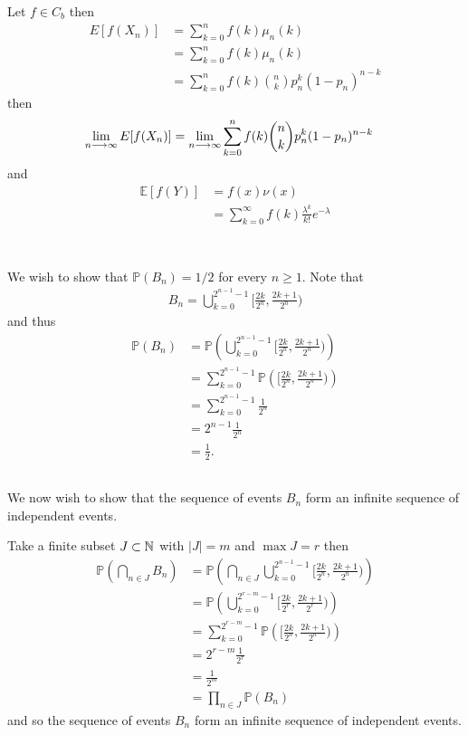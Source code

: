 \documentclass{unswmaths}
\begin{document}
Let $ f \in C_b $ then 
\begin{align}
	E[f(X_n)] &= \sum_{k=0}^n f(k) \mu_n(k) \\
		&= \sum_{k=0}^n f(k) \mu_n(k) \\
		&= \sum_{k=0}^n f(k) {n\choose k} p_n^k(1-p_n)^{n-k}
\end{align}
then
\begin{align}
	\lim_{n\longrightarrow\infty} E[f(X_n)] &= \lim_{n \longrightarrow \infty}\sum_{k=0}^n f(k) {n\choose k} p_n^k(1-p_n)^{n-k}
\end{align}
and
\begin{align}
	\mathbb{E}[f(Y)] &= f(x) \nu(x) \\
		&= \sum_{k=0}^\infty f(k) \frac{\lambda^k}{k!} e^{-\lambda} \\
\end{align}

\section{}
\subsection{}
We wish to show that $ \mathbb{P}(B_n) = 1/2 $ for every $ n \geq 1 $.
Note that 
\begin{align}
	B_n = \bigcup_{k=0}^{2^{n-1} - 1} \Big[ \frac{2k}{2^n}, \frac{2k+1}{2^n} \Big)
\end{align}
and thus
\begin{align}
	\mathbb{P}(B_n) &= \mathbb{P}\left( \bigcup_{k=0}^{2^{n-1} - 1} \Big[ \frac{2k}{2^n}, \frac{2k+1}{2^n} \Big) \right) \\
		&= \sum_{k=0}^{2^{n-1}-1} \mathbb{P}\left( \Big[ \frac{2k}{2^n}, \frac{2k+1}{2^n} \Big) \right) \\
		&= \sum_{k=0}^{2^{n-1}-1} \frac{1}{2^n} \\
		&= 2^{n-1} \frac{1}{2^n} \\
		&= \frac{1}{2}.
\end{align}
\subsection{}
We now wish to show that the sequence of events $ B_n $ form an infinite sequence of independent events. 

Take a finite subset $ J \subset \mathbb{N} $ with $ |J| = m $ and $ \max J = r $ then
\begin{align}
	\mathbb{P}\left( \bigcap_{n \in J} B_n \right) &= \mathbb{P}\left( \bigcap_{n \in J} \bigcup_{k=0}^{2^{n-1} - 1} \Big[ \frac{2k}{2^n}, \frac{2k+1}{2^n} \Big) \right) \\
	&= \mathbb{P} \left( \bigcup_{k=0}^{2^{r-m} - 1} \Big[ \frac{2k}{2^r}, \frac{2k+1}{2^r} \Big)\right) \\
	&=  \sum_{k=0}^{2^{r-m} - 1} \mathbb{P} \left( \Big[ \frac{2k}{2^n}, \frac{2k+1}{2^n} \Big) \right) \\
	&= 2^{r-m} \frac{1}{2^r} \\
	&= \frac{1}{2^m} \\
	&= \prod_{n \in J} \mathbb{P}\left( B_n \right)
\end{align}
and so the sequence of events $ B_n $ form an infinite sequence of independent events.
\end{document}
